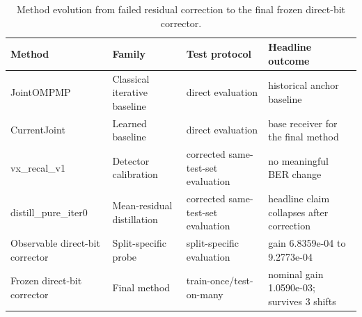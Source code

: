 \begin{table}[t]
\centering
\caption{Method evolution from failed residual correction to the final frozen direct-bit corrector.}
\label{tab:method_evolution}
\begin{tabular}{p{2.6cm}p{2.8cm}p{3.2cm}p{6.4cm}}
\toprule
Method & Family & Test protocol & Headline outcome \\
\midrule
JointOMPMP & Classical iterative baseline & direct evaluation & historical anchor baseline \\
CurrentJoint & Learned baseline & direct evaluation & base receiver for the final method \\
vx\_recal\_v1 & Detector calibration & corrected same-test-set evaluation & no meaningful BER change \\
distill\_pure\_iter0 & Mean-residual distillation & corrected same-test-set evaluation & headline claim collapses after correction \\
Observable direct-bit corrector & Split-specific probe & split-specific evaluation & gain 6.8359e-04 to 9.2773e-04 \\
Frozen direct-bit corrector & Final method & train-once/test-on-many & nominal gain 1.0590e-03; survives 3 shifts \\
\bottomrule
\end{tabular}
\end{table}
